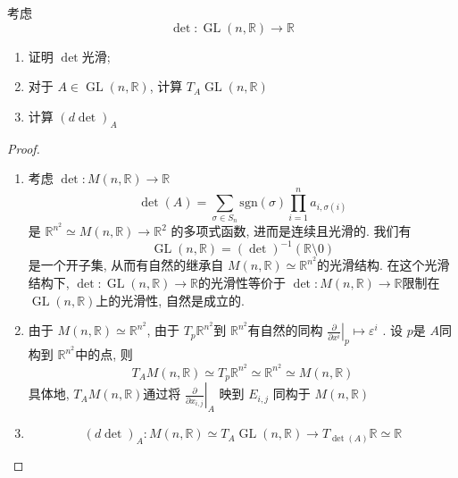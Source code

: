 \documentclass[../main.tex]{subfiles}
\begin{document}
\begin{exercise}{}{}
    考虑 \[
    \det : \operatorname{GL} \left( n,\mathbb{R}  \right)\to \mathbb{R}  
    \]\begin{enumerate}
        \item 证明 \(  \det   \)光滑;
        \item 对于 \(  A \in \operatorname{GL} \left( n,\mathbb{R}  \right)   \), 计算 \(  T_{A}\operatorname{GL} \left( n,\mathbb{R}  \right)   \)
        \item 计算 \(  \left( d \det  \right)_{A}   \)    
    \end{enumerate}
    
\end{exercise}
\begin{proof}
  \begin{enumerate}
    \item   考虑 \(  \det :M\left( n,\mathbb{R}  \right)\to \mathbb{R}    \) \[
    \det \left( A \right)= \sum _{ \sigma \in S_{n}} \mathrm{sgn}\left(  \sigma  \right)\prod _{i= 1}^{n}a_{i, \sigma \left( i \right) } 
    \]是 \( \mathbb{R} ^{n^{2}}\simeq  M\left( n,\mathbb{R}  \right)\to \mathbb{R} ^{2}   \)  的多项式函数, 进而是连续且光滑的. 我们有 \[
    \operatorname{GL} \left( n,\mathbb{R}  \right)=  \left( \det  \right)^{-1} \left(\mathbb{R} \setminus 0 \right)   
    \]是一个开子集, 从而有自然的继承自 \(  M\left( n,\mathbb{R}  \right)\simeq \mathbb{R} ^{n^{2}}   \)的光滑结构. 在这个光滑结构下, \(  \det : \operatorname{GL} \left( n,\mathbb{R}  \right)\to \mathbb{R}    \)的光滑性等价于 \(  \det : M\left( n,\mathbb{R}  \right)\to \mathbb{R}    \)限制在 \(  \operatorname{GL} \left( n,\mathbb{R}  \right)   \)上的光滑性, 自然是成立的.
    \item 由于 \(  M\left( n,\mathbb{R}  \right)\simeq \mathbb{R} ^{n^{2}}   \), 由于 \(  T_{p}\mathbb{R} ^{n^{2}}  \)到 \(  \mathbb{R} ^{n^{2}}  \)有自然的同构 \( \left.  \frac{\partial }{\partial x^{i}}   \right|_{p}  \mapsto \varepsilon^{i}\) . 设 \(  p  \)是 \(  A  \)同构到 \(  \mathbb{R} ^{n^{2}}  \)中的点, 则    \[
    T_{A}M\left( n,\mathbb{R}  \right) \simeq T_{p}\mathbb{R} ^{n^{2}}\simeq \mathbb{R} ^{n^{2}}\simeq M\left( n,\mathbb{R}  \right) 
    \]  具体地, \(  T_{A}M\left( n,\mathbb{R}  \right)   \)通过将 \(  \left. \frac{\partial }{\partial x_{i,j}}  \right|_{A} \) 映到 \(E_{i,j}  \)  同构于 \(  M\left( n,\mathbb{R}  \right)   \) 
    \item \[
    \left( d \det  \right)_{A}: M\left( n,\mathbb{R}  \right)\simeq  T_{A}\operatorname{GL} \left( n,\mathbb{R}  \right)\to   T_{\det \left( A \right) }\mathbb{R} \simeq \mathbb{R} 
\]
\end{enumerate}
\end{proof}
\end{document}
